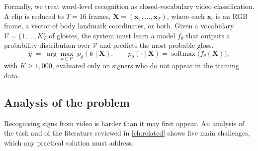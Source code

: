 Formally, we treat word-level recognition as closed-vocabulary video
classification. A clip is reduced to $T=16$ frames,
$\mathbf{X} = (\mathbf{x}_1, \dots, \mathbf{x}_T)$, where each
$\mathbf{x}_t$ is an RGB frame, a vector of body landmark coordinates, or
both. Given a vocabulary $\mathcal{V} = \{1, \dots, K\}$ of glosses, the
system must learn a model $f_\theta$ that outputs a probability
distribution over $\mathcal{V}$ and predicts the most probable gloss,
\begin{equation}
  \hat{y} \;=\; \arg\max_{k \in \mathcal{V}} \; p_\theta(k \mid \mathbf{X}),
  \qquad
  p_\theta(\cdot \mid \mathbf{X}) = \operatorname{softmax}\!\big(f_\theta(\mathbf{X})\big),
  \label{eq:task}
\end{equation}
with $K \geq 1{,}000$, evaluated only on signers who do not appear in the
training data.

\subsection{Analysis of the problem}

Recognising signs from video is harder than it may first appear. An
analysis of the task and of the literature reviewed in \cref{ch:related}
shows five main challenges, which any practical solution must address.

